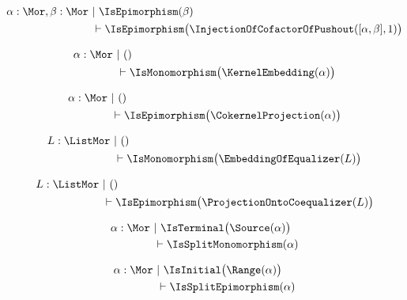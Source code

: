 \begin{sequent}
\begin{align*}
  \alpha:\Mor, \beta:\Mor  ~&|~ \IsEpimorphism( \beta ) \\
  &\vdash \IsEpimorphism\big( \InjectionOfCofactorOfPushout( [\alpha, \beta], 1 ) \big)
\end{align*}
\end{sequent}

\begin{sequent}
\begin{align*}
  \alpha:\Mor ~&|~ () \\
  &\vdash \IsMonomorphism\big( \KernelEmbedding( \alpha ) \big)
\end{align*}
\end{sequent}

\begin{sequent}
\begin{align*}
  \alpha:\Mor ~&|~ () \\
  &\vdash \IsEpimorphism\big( \CokernelProjection( \alpha ) \big)
\end{align*}
\end{sequent}

\begin{sequent}
\begin{align*}
  L:\ListMor ~&|~ () \\
  &\vdash \IsMonomorphism\big( \EmbeddingOfEqualizer( L ) \big)
\end{align*}
\end{sequent}

\begin{sequent}
\begin{align*}
  L:\ListMor ~&|~ () \\
  &\vdash \IsEpimorphism\big( \ProjectionOntoCoequalizer( L ) \big)
\end{align*}
\end{sequent}

\begin{sequent}\label{sequent:no_proper_context_7}
\begin{align*}
  \alpha:\Mor ~&|~ \IsTerminal\big( \Source( \alpha ) \big)\\
  &\vdash \IsSplitMonomorphism( \alpha )
\end{align*}
\end{sequent}

\begin{sequent}\label{sequent:no_proper_context_8}
\begin{align*}
  \alpha:\Mor ~&|~ \IsInitial\big( \Range( \alpha ) \big)\\
  &\vdash \IsSplitEpimorphism( \alpha )
\end{align*}
\end{sequent}

